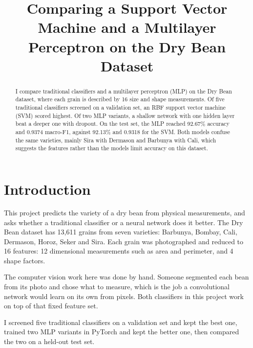\documentclass[conference,letterpaper]{IEEEtran}
\begin{document}
\title{Comparing a Support Vector Machine and a Multilayer Perceptron on the Dry Bean Dataset}

\author{
}

\maketitle

\begin{abstract}
I compare traditional classifiers and a multilayer perceptron (MLP) on the Dry Bean dataset, where each grain is described by 16 size and shape measurements. Of five traditional classifiers screened on a validation set, an RBF support vector machine (SVM) scored highest. Of two MLP variants, a shallow network with one hidden layer beat a deeper one with dropout. On the test set, the MLP reached 92.67\% accuracy and 0.9374 macro-F1, against 92.13\% and 0.9318 for the SVM. Both models confuse the same varieties, mainly Sira with Dermason and Barbunya with Cali, which suggests the features rather than the models limit accuracy on this dataset.
\end{abstract}

\section{Introduction}
This project predicts the variety of a dry bean from physical measurements, and asks whether a traditional classifier or a neural network does it better. The Dry Bean dataset \cite{koklu2020drybean, uci2020drybean} has 13,611 grains from seven varieties: Barbunya, Bombay, Cali, Dermason, Horoz, Seker and Sira. Each grain was photographed and reduced to 16 features: 12 dimensional measurements such as area and perimeter, and 4 shape factors.

The computer vision work here was done by hand. Someone segmented each bean from its photo and chose what to measure, which is the job a convolutional network would learn on its own from pixels. Both classifiers in this project work on top of that fixed feature set.

I screened five traditional classifiers on a validation set and kept the best one, trained two MLP variants in PyTorch \cite{paszke2019pytorch} and kept the better one, then compared the two on a held-out test set.
\end{document}
